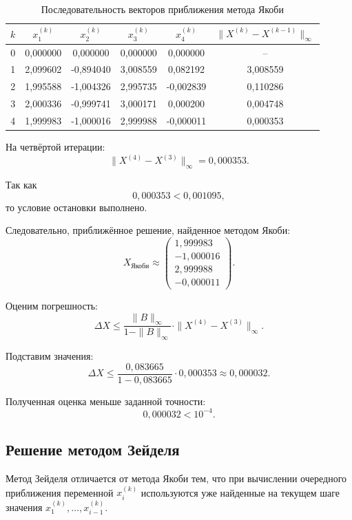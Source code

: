 \begin{table}[h!]
\centering
\caption{Последовательность векторов приближения метода Якоби}
\begin{tabular}{|c|c|c|c|c|c|}
\hline
$k$ & $x_1^{(k)}$ & $x_2^{(k)}$ & $x_3^{(k)}$ & $x_4^{(k)}$ & $\|X^{(k)}-X^{(k-1)}\|_{\infty}$\\
\hline
0 & 0{,}000000 & 0{,}000000 & 0{,}000000 & 0{,}000000 & --\\
\hline
1 & 2{,}099602 & -0{,}894040 & 3{,}008559 & 0{,}082192 & 3{,}008559\\
\hline
2 & 1{,}995588 & -1{,}004326 & 2{,}995735 & -0{,}002839 & 0{,}110286\\
\hline
3 & 2{,}000336 & -0{,}999741 & 3{,}000171 & 0{,}000200 & 0{,}004748\\
\hline
4 & 1{,}999983 & -1{,}000016 & 2{,}999988 & -0{,}000011 & 0{,}000353\\
\hline
\end{tabular}
\end{table}

На четвёртой итерации:
\[
\|X^{(4)}-X^{(3)}\|_{\infty}=0{,}000353.
\]

Так как
\[
0{,}000353<0{,}001095,
\]
то условие остановки выполнено.

Следовательно, приближённое решение, найденное методом Якоби:
\[
X_{\text{Якоби}}
\approx
\begin{pmatrix}
1{,}999983\\
-1{,}000016\\
2{,}999988\\
-0{,}000011
\end{pmatrix}.
\]

Оценим погрешность:
\[
\Delta X
\leq
\frac{\|B\|_{\infty}}{1-\|B\|_{\infty}}
\cdot
\|X^{(4)}-X^{(3)}\|_{\infty}.
\]

Подставим значения:
\[
\Delta X
\leq
\frac{0{,}083665}{1-0{,}083665}\cdot0{,}000353
\approx0{,}000032.
\]

Полученная оценка меньше заданной точности:
\[
0{,}000032<10^{-4}.
\]

\subsection{Решение методом Зейделя}

Метод Зейделя отличается от метода Якоби тем, что при вычислении очередного приближения переменной $x_i^{(k)}$ используются уже найденные на текущем шаге значения $x_1^{(k)},\ldots,x_{i-1}^{(k)}$.

